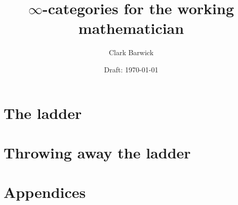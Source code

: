 \documentclass{cambridge7A}
\begin{document}
\author{Clark Barwick}
\title{$\infty$-categories for the working mathematician}
\date{Draft: \today}
\subtitle{}
\maketitle

\frontmatter

%
%
%
%

\setcounter{tocdepth}{2}
\tableofcontents

%

\mainmatter



\part{The ladder}

\noindent 



\part{Throwing away the ladder}

\noindent 

\appendix

\part{Appendices}%
\label{cha:appendices}



\backmatter




%
%

\end{document}
